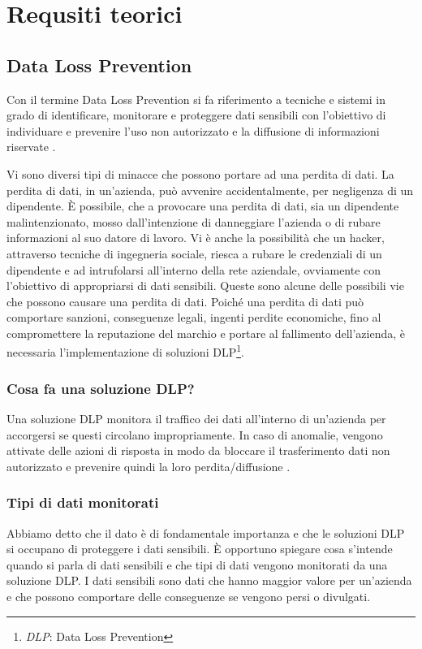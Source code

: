 \chapter{Requsiti teorici}

\section{Data Loss Prevention}
Con il termine Data Loss Prevention si fa riferimento a 
tecniche e sistemi in grado di identificare, monitorare 
e proteggere dati sensibili con l’obiettivo di individuare 
e prevenire l’uso non autorizzato e la diffusione di informazioni riservate \cite{DLP1}. 

Vi sono diversi tipi di minacce che possono portare ad una perdita di dati.
La perdita di dati, in un'azienda, può avvenire accidentalmente, per negligenza di un 
dipendente. È possibile, che a provocare una perdita di dati, sia un dipendente malintenzionato,
mosso dall'intenzione di danneggiare l'azienda o di rubare informazioni al suo datore di lavoro.
Vi è anche la possibilità che un hacker, attraverso tecniche di ingegneria sociale, riesca a rubare
le credenziali di un dipendente e ad intrufolarsi all'interno della rete aziendale, ovviamente con 
l'obiettivo di appropriarsi di dati sensibili.
Queste sono alcune delle possibili vie che possono causare una perdita di dati. Poiché una perdita di dati
può comportare sanzioni, conseguenze legali, ingenti perdite economiche, fino al compromettere la reputazione del 
marchio e portare al fallimento dell'azienda, è necessaria l'implementazione di soluzioni
DLP\footnote{\textit{DLP}: Data Loss Prevention}.
 

\subsection{Cosa fa una soluzione DLP?}
    Una soluzione DLP monitora il traffico dei dati all'interno di un'azienda per accorgersi se
    questi circolano impropriamente. In caso di anomalie, vengono attivate delle azioni di risposta 
    in modo da bloccare il trasferimento dati non autorizzato e prevenire quindi la loro perdita/diffusione \cite{DLP2}.
    


\subsection{Tipi di dati monitorati}
    Abbiamo detto che il dato è di fondamentale importanza e che le soluzioni DLP si occupano di proteggere i dati sensibili.
    È opportuno spiegare cosa s'intende quando si parla di dati sensibili e che tipi di dati vengono monitorati 
    da una soluzione DLP. I dati sensibili sono dati che hanno maggior valore per un'azienda e che possono comportare 
    delle conseguenze se vengono persi o divulgati.

